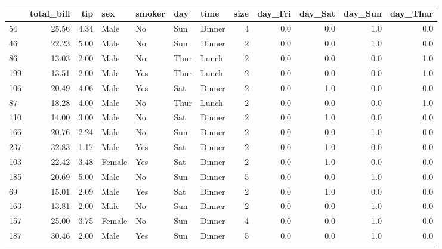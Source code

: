 \documentclass[
  letterpaper,
  DIV=11,
  numbers=noendperiod]{scrreprt}
\begin{document}
\begin{tabular}{lrrllllrrrrr}
\toprule
{} &  total\_bill &   tip &     sex & smoker &   day &    time &  size &  day\_Fri &  day\_Sat &  day\_Sun &  day\_Thur \\
\midrule
54  &       25.56 &  4.34 &    Male &     No &   Sun &  Dinner &     4 &      0.0 &      0.0 &      1.0 &       0.0 \\
46  &       22.23 &  5.00 &    Male &     No &   Sun &  Dinner &     2 &      0.0 &      0.0 &      1.0 &       0.0 \\
86  &       13.03 &  2.00 &    Male &     No &  Thur &   Lunch &     2 &      0.0 &      0.0 &      0.0 &       1.0 \\
199 &       13.51 &  2.00 &    Male &    Yes &  Thur &   Lunch &     2 &      0.0 &      0.0 &      0.0 &       1.0 \\
106 &       20.49 &  4.06 &    Male &    Yes &   Sat &  Dinner &     2 &      0.0 &      1.0 &      0.0 &       0.0 \\
87  &       18.28 &  4.00 &    Male &     No &  Thur &   Lunch &     2 &      0.0 &      0.0 &      0.0 &       1.0 \\
110 &       14.00 &  3.00 &    Male &     No &   Sat &  Dinner &     2 &      0.0 &      1.0 &      0.0 &       0.0 \\
166 &       20.76 &  2.24 &    Male &     No &   Sun &  Dinner &     2 &      0.0 &      0.0 &      1.0 &       0.0 \\
237 &       32.83 &  1.17 &    Male &    Yes &   Sat &  Dinner &     2 &      0.0 &      1.0 &      0.0 &       0.0 \\
103 &       22.42 &  3.48 &  Female &    Yes &   Sat &  Dinner &     2 &      0.0 &      1.0 &      0.0 &       0.0 \\
185 &       20.69 &  5.00 &    Male &     No &   Sun &  Dinner &     5 &      0.0 &      0.0 &      1.0 &       0.0 \\
69  &       15.01 &  2.09 &    Male &    Yes &   Sat &  Dinner &     2 &      0.0 &      1.0 &      0.0 &       0.0 \\
163 &       13.81 &  2.00 &    Male &     No &   Sun &  Dinner &     2 &      0.0 &      0.0 &      1.0 &       0.0 \\
157 &       25.00 &  3.75 &  Female &     No &   Sun &  Dinner &     4 &      0.0 &      0.0 &      1.0 &       0.0 \\
187 &       30.46 &  2.00 &    Male &    Yes &   Sun &  Dinner &     5 &      0.0 &      0.0 &      1.0 &       0.0 \\

\end{tabular}
\end{document}
